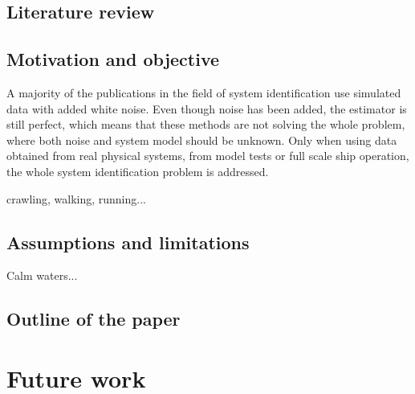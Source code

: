 \section{Literature review}


\section{Motivation and objective}
A majority of the publications in the field of system identification use simulated data with added white noise. Even though noise has been added, the estimator is still perfect, which means that these methods are not solving the whole problem, where both noise and system model should be unknown. Only when using data obtained from real physical systems, from model tests or full scale ship operation, the whole system identification problem is addressed.

crawling, walking, running...

\section{Assumptions and limitations}
Calm waters...

\section{Outline of the paper}






\chapter{Future work\label{ch:future_work}}
